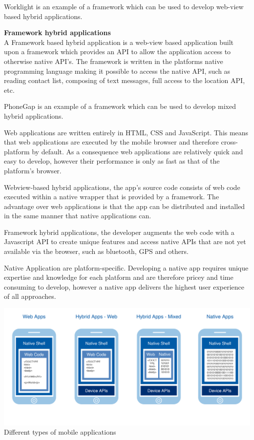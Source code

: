 Worklight is an example of a framework which can be used to develop web-view based hybrid applications.

{\bf Framework hybrid applications}\\
A Framework based hybrid application is a web-view based application built upon a framework which provides an API to allow the application access to otherwise native API's. The framework is written in the platforms native programming language making it possible to access the native API, such as reading contact list, composing of text messages, full access to the location API, etc.

PhoneGap is an example of a framework which can be used to develop mixed hybrid applications.

Web applications are written entirely in HTML, CSS and JavaScript. This means that web applications are executed by the mobile browser and therefore cross-platform by default. As a consequence web applications are relatively quick and easy to develop, however their performance is only as fast as that of the platform's browser.

Webview-based hybrid applications, the app's source code consists of web code executed within a native wrapper that is provided by a framework. The advantage over web applications is that the app can be distributed and installed in the same manner that native applications can.
 
Framework hybrid applications, the developer augments the web code with a Javascript API to create unique features and
access native APIs that are not yet available via the browser, such as bluetooth, GPS and others.
 
Native Application are platform-specific. Developing a native app requires unique expertise and knowledge for each platform and are therefore pricey and time consuming to develop, however a native app delivers the highest user experience of all approaches.

\begin{centering}
\includegraphics[scale=0.7]{images/apptypesdefined.png}\\{Different types of mobile applications\cite{IBM-Worklight2012}}\\
\end{centering}

